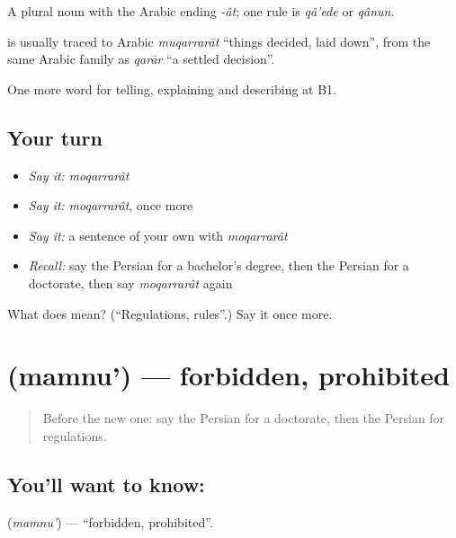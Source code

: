 A plural noun with the Arabic ending \emph{-ât}; one rule is \emph{qâ'ede} or \emph{qânun}.

\begin{cousinweb}
\textbf{} is usually traced to Arabic \emph{muqarrarāt} \textquotedblleft{}things decided, laid down\textquotedblright{}, from the same Arabic family as \emph{qarār} \textquotedblleft{}a settled decision\textquotedblright{}.
\end{cousinweb}

\begin{grammarlens}[title={What you've built}]
One more word for telling, explaining and describing at B1.
\end{grammarlens}

\subsection*{Your turn}
\begin{itemize}
\raggedright
  \item \emph{Say it:} \emph{moqarrarât}
  \item \emph{Say it:} \emph{moqarrarât}, once more
  \item \emph{Say it:} a sentence of your own with \emph{moqarrarât}
  \item \emph{Recall:} say the Persian for a bachelor's degree, then the Persian for a doctorate, then say \emph{moqarrarât} again
\end{itemize}

\begin{tcolorbox}[breakable,colback=teal!4,colframe=teal!35!black,title={Before you move on}]
What does  mean? (\textquotedblleft{}Regulations, rules\textquotedblright{}.) Say it once more.
\end{tcolorbox}
\section[\texorpdfstring{\fa{ممنوع} (mamnu')}{ممنوع (mamnu')}]{ (mamnu') — forbidden, prohibited}

\label{lesson:FA-C404-mamnu}



\begin{quote}
Before the new one: say the Persian for a doctorate, then the Persian for regulations.
\end{quote}

\subsection*{You'll want to know: }
\textbf{} (\emph{mamnu'}) — \textquotedblleft{}forbidden, prohibited\textquotedblright{}.

